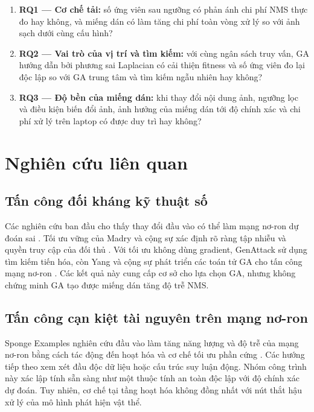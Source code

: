 \documentclass[a4paper,fleqn]{cas-dc}
\begin{document}
\begin{enumerate}[leftmargin=*]
    \item \textbf{RQ1 --- Cơ chế tải:} số ứng viên sau ngưỡng có phản ánh chi phí NMS thực đo hay không, và miếng dán có làm tăng chi phí toàn vòng xử lý so với ảnh sạch dưới cùng cấu hình?
    \item \textbf{RQ2 --- Vai trò của vị trí và tìm kiếm:} với cùng ngân sách truy vấn, GA hướng dẫn bởi phương sai Laplacian có cải thiện fitness và số ứng viên đo lại độc lập so với GA trung tâm và tìm kiếm ngẫu nhiên hay không?
    \item \textbf{RQ3 --- Độ bền của miếng dán:} khi thay đổi nội dung ảnh, ngưỡng lọc và điều kiện biến đổi ảnh, ảnh hưởng của miếng dán tới độ chính xác và chi phí xử lý trên laptop có được duy trì hay không?
\end{enumerate}

\section{Nghiên cứu liên quan}

\subsection{Tấn công đối kháng kỹ thuật số}

Các nghiên cứu ban đầu cho thấy thay đổi đầu vào có thể làm mạng nơ-ron dự đoán sai \cite{szegedy2013,goodfellow2014}. Tối ưu vững của Madry và cộng sự xác định rõ ràng tập nhiễu và quyền truy cập của đối thủ \cite{madry2017}. Với tối ưu không dùng gradient, GenAttack sử dụng tìm kiếm tiến hóa, còn Yang và cộng sự phát triển các toán tử GA cho tấn công mạng nơ-ron \cite{alzantot2019,yang2022}. Các kết quả này cung cấp cơ sở cho lựa chọn GA, nhưng không chứng minh GA tạo được miếng dán tăng độ trễ NMS.

\subsection{Tấn công cạn kiệt tài nguyên trên mạng nơ-ron}

Sponge Examples nghiên cứu đầu vào làm tăng năng lượng và độ trễ của mạng nơ-ron bằng cách tác động đến hoạt hóa và cơ chế tối ưu phần cứng \cite{shumailov2021}. Các hướng tiếp theo xem xét đầu độc dữ liệu hoặc cấu trúc suy luận động. Nhóm công trình này xác lập tính sẵn sàng như một thuộc tính an toàn độc lập với độ chính xác dự đoán. Tuy nhiên, cơ chế tại tầng hoạt hóa không đồng nhất với nút thắt hậu xử lý của mô hình phát hiện vật thể.
\end{document}
